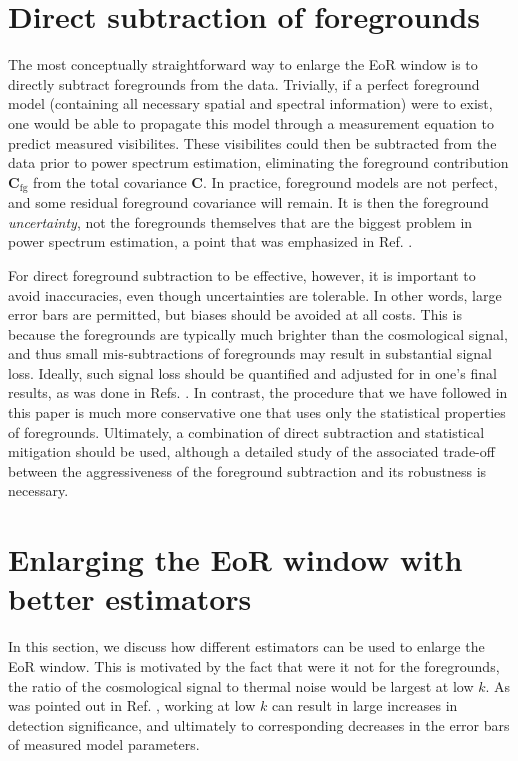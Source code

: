 \documentclass[twocolumn,aps,prd,nofootinbib,showpacs]{revtex4-1}
\begin{document}
\section{Direct subtraction of foregrounds}

The most conceptually straightforward way to enlarge the EoR window is to directly subtract foregrounds from the data.  Trivially, if a perfect foreground model (containing all necessary spatial and spectral information) were to exist, one would be able to propagate this model through a measurement equation to predict measured visibilites.  These visibilites could then be subtracted from the data prior to power spectrum estimation, eliminating the foreground contribution $\mathbf{C}_\textrm{fg}$ from the total covariance $\mathbf{C}$.  In practice, foreground models are not perfect, and some residual foreground covariance will remain.  It is then the foreground \emph{uncertainty}, not the foregrounds themselves that are the biggest problem in power spectrum estimation, a point that was emphasized in Ref. \cite{Trott2012}.

For direct foreground subtraction to be effective, however, it is important to avoid inaccuracies, even though uncertainties are tolerable.  In other words, large error bars are permitted, but biases should be avoided at all costs.  This is because the foregrounds are typically much brighter than the cosmological signal, and thus small mis-subtractions of foregrounds may result in substantial signal loss.  Ideally, such signal loss should be quantified and adjusted for in one's final results, as was done in Refs. \cite{Masui2013,Paciga2013,Switzer2013}.  In contrast, the procedure that we have followed in this paper is much more conservative one that uses only the statistical properties of foregrounds.  Ultimately, a combination of direct subtraction and statistical mitigation should be used, although a detailed study of the associated trade-off between the aggressiveness of the foreground subtraction and its robustness is necessary.

\section{Enlarging the EoR window with better estimators}
\label{sec:Enlarging}
In this section, we discuss how different estimators can be used to enlarge the EoR window.  This is motivated by the fact that were it not for the foregrounds, the ratio of the cosmological signal to thermal noise would be largest at low $k$.  As was pointed out in Ref. \cite{Pober2014}, working at low $k$ can result in large increases in detection significance, and ultimately to corresponding decreases in the error bars of measured model parameters.
\end{document}
